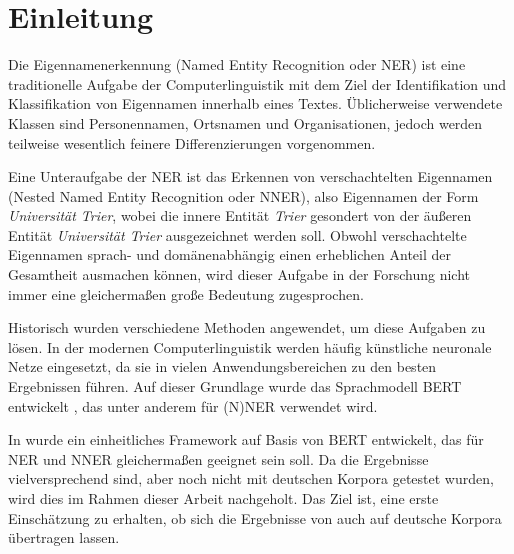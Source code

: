 

\chapter{Einleitung}
\label{ch:Einleitung}

Die Eigennamenerkennung (Named Entity Recognition oder NER) ist eine traditionelle Aufgabe der Computerlinguistik mit dem Ziel der Identifikation und Klassifikation von Eigennamen innerhalb eines Textes. Üblicherweise verwendete Klassen sind Personennamen, Ortsnamen und Organisationen, jedoch werden teilweise wesentlich feinere Differenzierungen vorgenommen.

Eine Unteraufgabe der NER ist das Erkennen von verschachtelten Eigennamen (Nested Named Entity Recognition oder NNER), also Eigennamen der Form \emph{Universität Trier}, wobei die innere Entität \emph{Trier} gesondert von der äußeren Entität \emph{Universität Trier} ausgezeichnet werden soll. Obwohl verschachtelte Eigennamen sprach- und domänenabhängig einen erheblichen Anteil der Gesamtheit ausmachen können, wird dieser Aufgabe in der Forschung nicht immer eine gleichermaßen große Bedeutung zugesprochen.

Historisch wurden verschiedene Methoden angewendet, um diese Aufgaben zu lösen. In der modernen Computerlinguistik werden häufig künstliche neuronale Netze eingesetzt, da sie in vielen Anwendungsbereichen zu den besten Ergebnissen führen. Auf dieser Grundlage wurde das Sprachmodell BERT entwickelt \parencite{devlin2019bert}, das unter anderem für (N)NER verwendet wird.

In \textcite{li2019unified} wurde ein einheitliches Framework auf Basis von BERT entwickelt, das für NER und NNER gleichermaßen geeignet sein soll. Da die Ergebnisse vielversprechend sind, aber noch nicht mit deutschen Korpora getestet wurden, wird dies im Rahmen dieser Arbeit nachgeholt. Das Ziel ist, eine erste Einschätzung zu erhalten, ob sich die Ergebnisse von  auch auf deutsche Korpora übertragen lassen.

